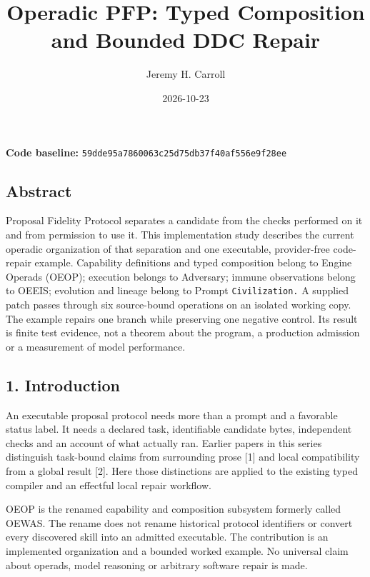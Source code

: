 \documentclass[
  11pt,
]{article}
\title{Operadic PFP: Typed Composition and Bounded DDC Repair}
\author{Jeremy H. Carroll}
\date{2026-10-23}
\begin{document}
\makeatletter
\begin{center}
{\LARGE \@title\par}
\vspace{0.8em}
{\normalsize \@author\par}
\vspace{0.5em}
{\small \@date\par}
\end{center}
\makeatother

\textbf{Code baseline:}
\nolinkurl{59dde95a7860063c25d75db37f40af556e9f28ee}

\subsection{Abstract}\label{abstract}

Proposal Fidelity Protocol separates a candidate from the checks
performed on it and from permission to use it. This implementation study
describes the current operadic organization of that separation and one
executable, provider-free code-repair example. Capability definitions
and typed composition belong to Engine Operads (OEOP); execution
belongs to Adversary; immune observations belong to OEEIS; evolution and
lineage belong to Prompt \nolinkurl{Civilization.} A supplied patch
passes through six source-bound operations on an isolated working copy.
The example repairs one branch while preserving one negative control.
Its result is finite test evidence, not a theorem about the program, a
production admission or a measurement of model performance.

\subsection{1. Introduction}\label{introduction}

An executable proposal protocol needs more than a prompt and a favorable
status label. It needs a declared task, identifiable candidate bytes,
independent checks and an account of what actually ran. Earlier papers
in this series distinguish task-bound claims from surrounding prose
{[}1{]} and local compatibility from a global result {[}2{]}. Here those
distinctions are applied to the existing typed compiler and an effectful
local repair workflow.

OEOP is the renamed capability and composition subsystem formerly called
OEWAS. The rename does not rename historical protocol identifiers or
convert every discovered skill into an admitted executable. The
contribution is an implemented organization and a bounded worked
example. No universal claim about operads, model reasoning or arbitrary
software repair is made.
\end{document}
